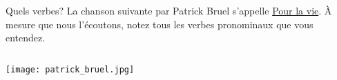 \begin{frame}{Quels verbes?}
  La chanson suivante par Patrick Bruel s'appelle \href{https://youtu.be/Rglh1je-CrE?si=tLyIEmDT2dIacOfN}{Pour la vie}.
  À mesure que nous l'écoutons, notez tous les verbes pronominaux que vous entendez.
  \begin{columns}
      \begin{center}
        \texttt{[image: patrick\_bruel.jpg]}
      \end{center}
  \end{columns}
\end{frame}
